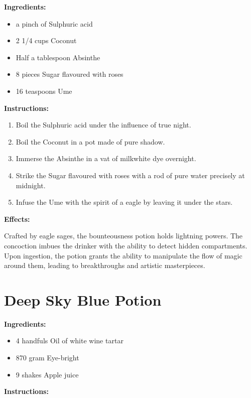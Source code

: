\documentclass{article}
\begin{document}
\textbf{Ingredients:}

\begin{itemize}
  \item a pinch of Sulphuric acid
  \item 2 1/4 cups Coconut
  \item Half a tablespoon Absinthe
  \item 8 pieces Sugar flavoured with roses
  \item 16 teaspoons Ume
\end{itemize}

\textbf{Instructions:}

\begin{enumerate}
  \item Boil the Sulphuric acid under the influence of true night.
  \item Boil the Coconut in a pot made of pure shadow.
  \item Immerse the Absinthe in a vat of milkwhite dye overnight.
  \item Strike the Sugar flavoured with roses with a rod of pure water precisely at midnight.
  \item Infuse the Ume with the spirit of a eagle by leaving it under the stars.
\end{enumerate}

\textbf{Effects:}

Crafted by eagle sages, the bounteousness potion holds lightning powers. The concoction imbues the drinker with the ability to detect hidden compartments. Upon ingestion, the potion grants the ability to manipulate the flow of magic around them, leading to breakthroughs and artistic masterpieces.

\newpage
\section*{Deep Sky Blue Potion}

\textbf{Ingredients:}

\begin{itemize}
  \item 4 handfuls Oil of white wine tartar
  \item 870 gram Eye-bright
  \item 9 shakes Apple juice
\end{itemize}

\textbf{Instructions:}
\end{document}
